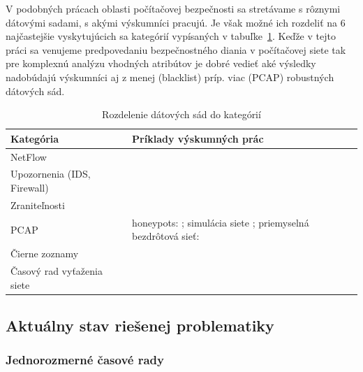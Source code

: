 \documentclass[thesismargins, thesislinespacing, openright, upjsfrontpage, combineabstracts]{rnthesis}
\begin{document}
V podobných prácach oblasti počítačovej bezpečnosti sa stretávame s rôznymi dátovými sadami, s akými výskumníci pracujú. Je však možné ich rozdeliť na 6 najčastejšie vyskytujúcich sa kategórií vypísaných v tabuľke~\ref{tab:c1_datasets}. Keďže v tejto práci sa venujeme predpovedaniu bezpečnostného diania v počítačovej siete tak pre komplexnú analýzu vhodných atribútov je dobré vedieť aké výsledky nadobúdajú výskumníci aj z menej (blacklist) príp. viac (PCAP) robustných dátových sád.

\begin{table}[]
    \centering
    \begin{tabular}{ | p{5cm} | p{9cm} | }
         \hline \textbf{Kategória} & \textbf{Príklady výskumných prác} \\
         \hline
         \hline NetFlow & \cite{zang2019adaptive,fang2019deep,millar2019using,bakhshi2015user,jakalan2015profiling,marchette1999statistical,bernaille2006traffic,jirsik2020cyber} \\
         \hline Upozornenia \newline (IDS, Firewall) & \cite{granat2019big,werner2017time,shin2013advanced,ramaki2015real,soldo2011blacklisting} \\
         \hline Zraniteľnosti & \cite{tang2016exploiting,condon2008analysis,roumani2015time,tang2018disclosure,tang2017big,pokhrel2017cybersecurity} \\
         \hline PCAP & honeypots: \cite{zhan2015predicting,berti2017profiling,hammerschmidt2016efficient}; \newline simulácia siete \cite{jiang2004detecting}; \newline priemyselná bezdrôtová sieť: \cite{wei2012intrusion}  \\
         \hline Čierne zoznamy & \cite{liu2015cloudy} \\
         \hline Časový rad vyťaženia siete & \cite{cortez2012multi,hasegawa2001applications,papagiannaki2005long,sang2002predictability,wang2008internet} \\
         \hline
    \end{tabular}
    \caption{Rozdelenie dátových sád do kategórií}
    \label{tab:c1_datasets}
\end{table}

\subsection{Aktuálny stav riešenej problematiky}

\subsubsection{Jednorozmerné časové rady}
\end{document}

